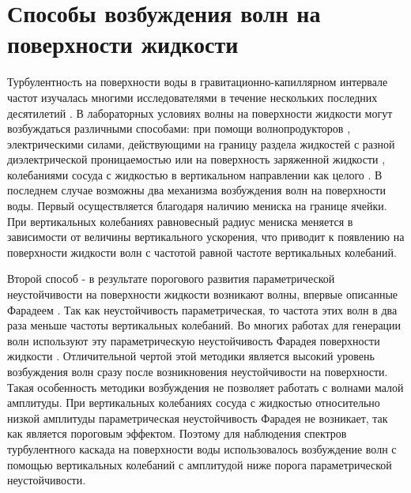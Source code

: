 \section{Способы возбуждения волн на поверхности жидкости}\label{p1_methodsExt}

Турбулентноcть на поверхности воды в гравитационно-капиллярном интервале частот изучалась многими исследователями в течение нескольких последних десятилетий \cite{Falcon2007, Henry2000, Shats2010, Denissenko2007}. В лабораторных условиях волны на поверхности жидкости могут возбуждаться различными способами: при помощи волнопродукторов \cite{Havelock1929, Falcon2007}, электрическими силами, действующими на границу раздела жидкостей с разной диэлектрической проницаемостью \cite{Kalinichenko1982} или на поверхность заряженной жидкости \cite{Brazhnikov2002}, колебаниями сосуда с жидкостью в вертикальном направлении как целого \cite{Miles1990}. В последнем случае возможны два механизма возбуждения волн на поверхности воды. Первый осуществляется благодаря наличию мениска на границе ячейки. При вертикальных колебаниях равновесный радиус мениска меняется в зависимости от величины вертикального ускорения, что приводит к появлению на поверхности жидкости волн с частотой равной частоте вертикальных колебаний. 

Второй способ - в результате порогового развития параметрической неустойчивости на поверхности жидкости возникают волны, впервые описанные Фарадеем \cite{Faraday1831}. Так как неустойчивость параметрическая, то частота этих волн в два раза меньше частоты вертикальных колебаний. Во многих работах для генерации волн используют эту параметрическую неустойчивость Фарадея поверхности жидкости \cite{Henry2000, Shats2010, Denissenko2007}. Отличительной чертой этой методики является высокий уровень возбуждения волн сразу после возникновения неустойчивости на поверхности. Такая особенность методики возбуждения не позволяет работать с волнами малой амплитуды. При вертикальных колебаниях сосуда с жидкостью относительно низкой амплитуды параметрическая неустойчивость Фарадея не возникает, так как является пороговым эффектом. Поэтому для наблюдения спектров турбулентного каскада на поверхности воды использовалось возбуждение волн с помощью вертикальных колебаний с амплитудой ниже порога параметрической неустойчивости. 

